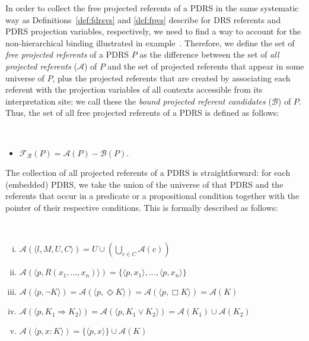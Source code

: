 In order to collect the free projected referents of a PDRS in the same
systematic way as Definitions~\ref{def:fdrsvs} and \ref{def:fpvs} describe
for DRS referents and PDRS projection variables, respectively, we need to
find a way to account for the non-hierarchical binding illustrated in
example~\Last.  Therefore, we define the set of \textit{free projected
referents} of a PDRS $P$ as the difference between the set of \textit{all
projected referents} ($\mathcal{A}$) of $P$ and the set of projected
referents that appear in some universe of $P$, plus the projected referents
that are created by associating each referent with the projection variables
of all contexts accessible from its interpretation site; we call these the
\textit{bound projected referent candidates} ($\mathcal{B}$) of $P$.
Thus, the set of all free projected referents of a PDRS is defined as
follows:

\begin{definition}~
  \begin{itemize}
    \item $\mathcal{F_R}(P) = \mathcal{A}(P) - \mathcal{B}(P)$.
  \end{itemize}
\end{definition}

\noindent The collection of all projected referents of a PDRS is
straightforward: for each (embedded) PDRS, we take the union of the universe
of that PDRS and the referents that occur in a predicate or a propositional
condition together with the pointer of their respective conditions. This is
formally described as follows:

\begin{subdefinition}~
  \begin{enumerate}[i.]
    \item $\mathcal{A}(\langle l, M, U, C \rangle)
      = U \cup (\bigcup_{c\in C} \mathcal{A}(c))$
    \item $\mathcal{A}(\langle p, R(x_1,...,x_n)\rangle)
      = \{\langle p, x_1\rangle, ..., \langle p, x_n\rangle\}$
    \item $\mathcal{A}(\langle p,\neg K\rangle) 
      = \mathcal{A}(\langle p,\Diamond K\rangle) 
      = \mathcal{A}(\langle p,\Box K\rangle)
      = \mathcal{A}(K)$
    \item $\mathcal{A}(\langle p,K_1 \Rightarrow K_2\rangle)
      = \mathcal{A}(\langle p,K_1 \vee K_2\rangle)
      = \mathcal{A}(K_1) \cup \mathcal{A}(K_2)$
    \item $\mathcal{A}(\langle p,x:K\rangle)
      = \{\langle p,x \rangle\} \cup \mathcal{A}(K)$
  \end{enumerate}
\end{subdefinition}

